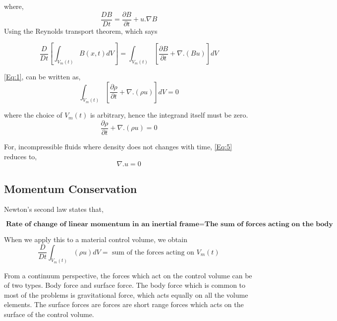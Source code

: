 where,
\begin{equation}
 \frac{DB}{Dt} = \frac{\partial B}{\partial t}+u.\nabla B
\end{equation}
Using the Reynolds transport theorem, which says

\begin{equation}
 \frac{D}{Dt}\left[\int_{V_m(t)}{}{B(x,t)}dV\right] = \int_{V_m(t)}{}{\left[\frac{\partial B}{\partial t} + \nabla . (Bu)\right] dV}
 \label{Eq:3}
\end{equation}

\ref{Eq:1}, can be written as, 
\begin{equation}
 \int_{V_m(t)}{}{\left[\frac{\partial \rho}{\partial t} + \nabla . (\rho u)\right] dV} = 0
\end{equation}

where the choice of $V_m(t)$ is arbitrary, hence the integrand itself must be zero.
\begin{equation}
 \frac{\partial \rho}{\partial t} + \nabla . (\rho u) = 0
 \label{Eq:5}
\end{equation}

For, incompressible fluids where density does not changes with time, \ref{Eq:5} reduces to,
\begin{equation}
 \nabla .u = 0
 \label{Eq:6}
\end{equation}

\subsection{Momentum Conservation}
Newton's second law states that,

\begin{equation}
 \textbf{Rate of change of linear momentum in an inertial frame} = \textbf{The sum of forces acting on the body}
\end{equation}

When we apply this to a material control volume, we obtain
\begin{equation}
 \frac{D}{Dt}\int_{V_m(t)} (\rho u) d V = \text{ sum of the forces acting on } V_m(t)
 \label{Eq:8}
\end{equation}

From a continuum perspective, the forces which act on the control volume can be of two types. Body force and surface force. The body force
which is common to most of the problems is gravitational force, which acts equally on all the volume elements. The surface forces are forces
are short range forces which acts on the surface of the control volume.

